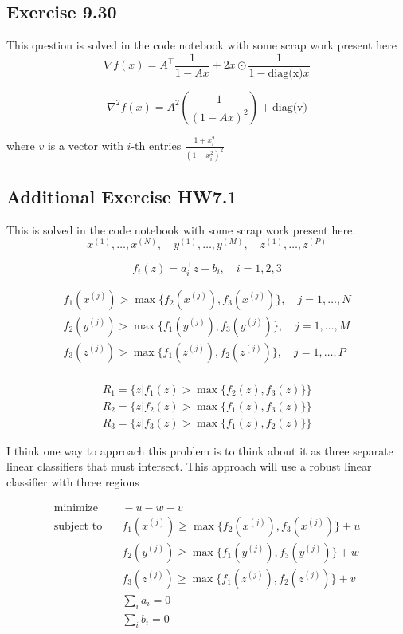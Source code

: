 \subsection{Exercise 9.30}
This question is solved in the code notebook with some scrap work present here
\begin{equation}
    \nabla f(x) = A^\top \frac{1}{1-Ax} + 2x \odot \frac{1}{1 - \text{diag(x)}x}
\end{equation}

\begin{equation}
    \nabla^2 f(x) = A^2(\frac{1}{(1-Ax)^2}) + \text{diag(v)}
\end{equation}

where $v$ is a vector with $i$-th entries $\frac{1+x_i^2}{(1-x_i^2)^2}$

\subsection{Additional Exercise HW7.1}
This is solved in the code notebook with some scrap work present here.
\begin{equation}
    x^{(1)}, \dots, x^{(N)}, \quad y^{(1)}, \dots, y^{(M)}, \quad z^{(1)}, \dots, z^{(P)}
\end{equation}

\begin{equation}
    f_i(z) = a_i^\top z - b_i, \quad i=1,2,3
\end{equation}

\begin{gather}
    f_1(x^{(j)}) > \max \{ f_2(x^{(j)}), f_3(x^{(j)}) \}, \quad j=1,\dots,N \\
    f_2(y^{(j)}) > \max \{ f_1(y^{(j)}), f_3(y^{(j)}) \}, \quad j=1,\dots,M \\
    f_3(z^{(j)}) > \max \{ f_1(z^{(j)}), f_2(z^{(j)}) \}, \quad j=1,\dots,P \\
\end{gather}

\begin{gather}
    R_1 = \{ z | f_1(z) > \max \{ f_2(z), f_3(z) \} \} \\
    R_2 = \{ z | f_2(z) > \max \{ f_1(z), f_3(z) \} \} \\
    R_3 = \{ z | f_3(z) > \max \{ f_1(z), f_2(z) \} \}
\end{gather}

I think one way to approach this problem is to think about it as three separate linear classifiers that must intersect. This approach will use a robust linear classifier with three regions

\begin{align}
  \text{minimize} & \quad -u - w - v \\
  \text{subject to} & \quad f_1(x^{(j)}) \geq \max \{ f_2(x^{(j)}), f_3(x^{(j)}) \} + u \\
  & \quad f_2(y^{(j)}) \geq \max \{ f_1(y^{(j)}), f_3(y^{(j)}) \} + w \\
  & \quad f_3(z^{(j)}) \geq \max \{ f_1(z^{(j)}), f_2(z^{(j)}) \} + v \\
  & \quad \sum_i a_i = 0 \\
  & \quad \sum_i b_i = 0
\end{align}